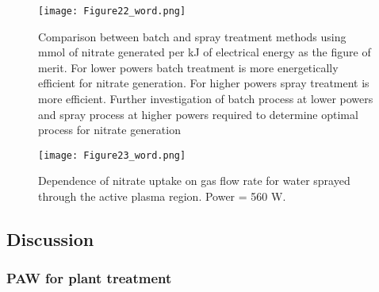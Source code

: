 \begin{figure}[htbp]
  \centering
  \texttt{[image: Figure22\_word.png]}
  \caption{Comparison between batch and spray treatment methods using mmol of nitrate generated per kJ of electrical energy as the figure of merit.  For lower powers batch treatment is more energetically efficient for nitrate generation.  For higher powers spray treatment is more efficient.  Further investigation of batch process at lower powers and spray process at higher powers required to determine optimal process for nitrate generation}
  \label{fig:nitro_compare_power}
\end{figure}

\begin{figure}[htbp]
  \centering
  \texttt{[image: Figure23\_word.png]}
  \caption{Dependence of nitrate uptake on gas flow rate for water sprayed through the active plasma region. Power = 560 W.}
  \label{fig:nitro_vs_flow_spray}
\end{figure}

\subsection{Discussion}

\subsubsection{PAW for plant treatment}

